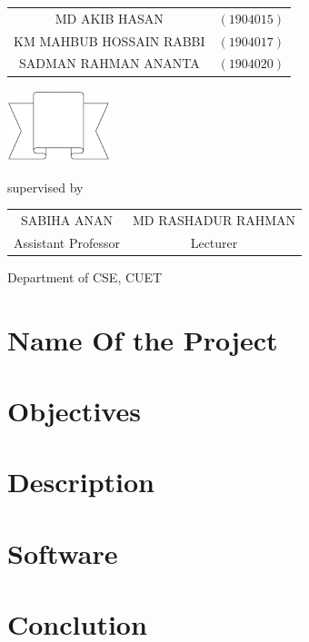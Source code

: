 \documentclass[a4paper,12pt]{report}
\begin{document}
\begin{titlepage}
{		\begin{tabular}{cl}
			MD AKIB HASAN           & $(1904015)$ \\
			KM MAHBUB HOSSAIN RABBI & $(1904017)$ \\
			SADMAN RAHMAN ANANTA    & $(1904020)$ \\
		\end{tabular}
	}
	\parbox[r]{8cm}{
		\vspace{.5cm}
		\begin{center}
			\includegraphics[width=3cm, keepaspectratio]{remarks.png}
		\end{center}
	}

	\vspace{2cm}
	supervised by
	\vspace{.5cm}

	\begin{tabular}{cc}
		SABIHA ANAN         & MD RASHADUR RAHMAN \\
		Assistant Professor & Lecturer           \\
	\end{tabular}

	Department of CSE, CUET
	\vfill
\end{titlepage}


\section*{Name Of the Project}
\section*{Objectives}
\section*{Description}
\section*{Software}
\section*{Conclution}
\end{document}
